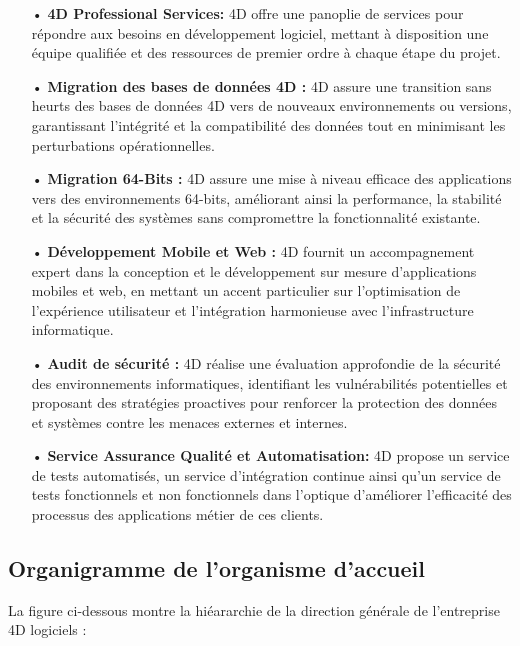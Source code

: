\begin{itemize}
    \item[ • ] \textbf{4D Professional Services: } 4D offre une panoplie de services pour répondre aux besoins en développement logiciel, mettant à disposition une équipe qualifiée et des ressources de premier ordre à chaque étape du projet.\\
    \item[ • ] \textbf{Migration des bases de données 4D :} 4D assure une transition sans heurts des bases de données 4D vers de nouveaux environnements ou versions, garantissant l’intégrité et la compatibilité des données tout en minimisant les perturbations opérationnelles.\\
    \item[ • ] \textbf{Migration 64-Bits : } 4D assure une mise à niveau efficace des applications vers des environnements 64-bits, améliorant ainsi la performance, la stabilité et la sécurité des systèmes sans compromettre la fonctionnalité existante.\\
    \item[ • ] \textbf{Développement Mobile et Web :}  4D fournit un accompagnement expert dans la conception et le développement sur mesure d’applications mobiles et web, en mettant un accent particulier sur l’optimisation de l’expérience utilisateur et l’intégration harmonieuse avec l’infrastructure informatique.\\
    \item[ • ] \textbf{Audit de sécurité :}  4D réalise une évaluation approfondie de la sécurité des environnements informatiques, identifiant les vulnérabilités potentielles et proposant des stratégies proactives pour renforcer la protection des données et systèmes contre les menaces externes et internes.\\
    \item[ • ] \textbf{Service Assurance Qualité et Automatisation:}  4D propose un service de tests automatisés, un service d’intégration continue ainsi qu’un service de tests fonctionnels et non fonctionnels dans l’optique d’améliorer l’efficacité des processus des applications métier de ces clients.
\end{itemize}


\subsection{Organigramme de l’organisme d’accueil}
La figure ci-dessous montre la hiéararchie de la direction générale de l’entreprise 4D
logiciels :

